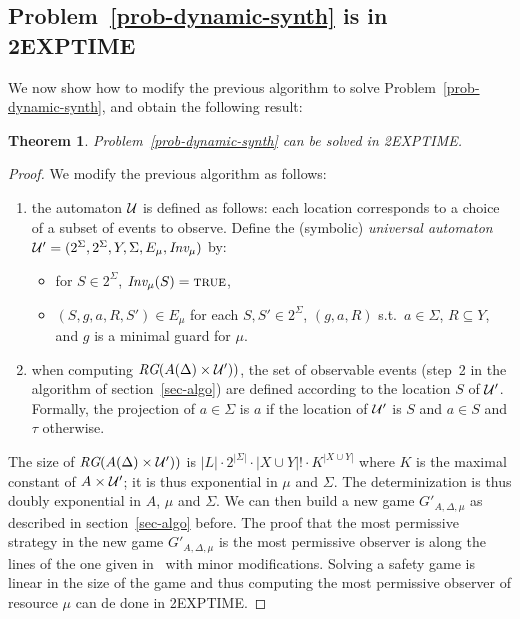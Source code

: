 \documentclass[letterpaper,10pt,conference]{ieeeconf}  \IEEEoverridecommandlockouts                              \overrideIEEEmargins
\def\st{{s.t.}~}
\newtheorem{theorem}{Theorem}
\def\calU{{\cal U}}
\def\tauac{\tau}
\def\true{\mbox{\textsc{true}}}
\def\rg{\textit{RG}}
\begin{document}
\subsection{Problem~\ref{prob-dynamic-synth} is in 2EXPTIME} \label{sec-synth}
We now show how to modify the previous algorithm to solve
Problem~\ref{prob-dynamic-synth}, and obtain the following result:
\begin{theorem}
  Problem~\ref{prob-dynamic-synth} can be solved in 2EXPTIME.
\end{theorem}
\begin{proof}
  We modify the previous algorithm as follows:
  \begin{enumerate}
  \item the automaton $\calU$ is defined as follows: each location
    corresponds to a choice of a subset of events to observe. Define
    the (symbolic) \emph{universal automaton}
    $\calU'=(2^\Sigma,2^\Sigma,Y,\Sigma,E_\mu,\inv_\mu)$ by:
\begin{itemize}
\item for $S \in 2^\Sigma$, $\inv_\mu(S)=\true$,
\item $(S,g,a,R,S') \in E_\mu$ for each $S,S' \in 2^\Sigma$, $(g,a,R)$
  \st $a \in \Sigma$, $R \subseteq Y$, and $g$ is a minimal guard for
  $\mu$. 
\end{itemize}
\item when computing $\rg(A(\Delta) \times \calU'))$, the set of
  observable events (step~2 in the algorithm of
  section~\ref{sec-algo}) are defined according to the location $S$ of
  $\calU'$.  Formally, the projection of $a \in \Sigma$ is $a$ if the
  location of $\calU'$ is $S$ and $a \in S$ and $\tauac$ otherwise.
  \end{enumerate}
  The size of $\rg(A(\Delta) \times \calU'))$ is $|L| \cdot
  2^{|\Sigma|} \cdot |X \cup Y|! \cdot K^{|X \cup Y|}$ where $K$ is
  the maximal constant of $A \times \calU'$; it is thus exponential in
  $\mu$ and $\Sigma$.  The determinization is thus doubly exponential
  in $A$, $\mu$ and $\Sigma$. We can then build a new game
  $G'_{A,\Delta,\mu}$ as described in section~\ref{sec-algo} before.
  The proof that the most permissive strategy in the new game
  $G'_{A,\Delta,\mu}$ is the most permissive observer is along the
  lines of the one given in~\cite{Bouyerfossacs05} with minor
  modifications.
Solving a safety game is linear in the size of the game and thus
  computing the most permissive observer of resource $\mu$ can de done
  in 2EXPTIME.
\end{proof}
\end{document}
